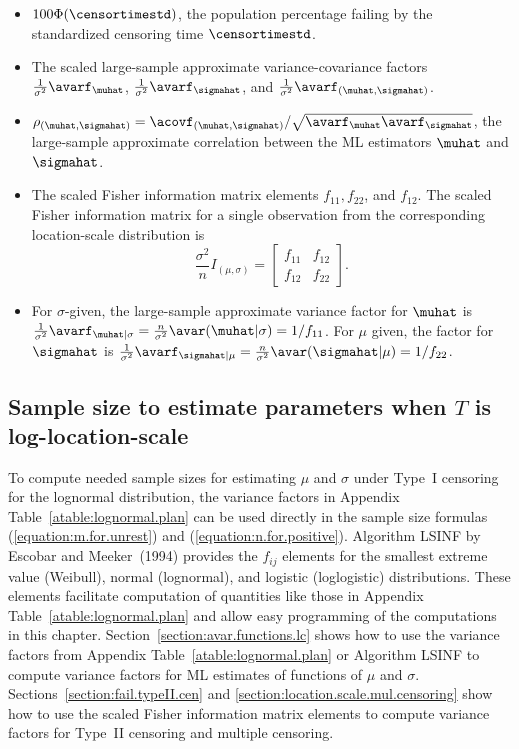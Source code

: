 \begin{itemize}
\item
$100\Phi(\censortimestd)$, the population percentage failing by
the standardized censoring time $\censortimestd$. 
\item
The scaled large-sample approximate variance-covariance factors
$\frac{1}{\sigma^2}\avarf_{\muhat}$,
$\frac{1}{\sigma^2}\avarf_{\sigmahat}$, and
$\frac{1}{\sigma^2}\avarf_{(\muhat,\sigmahat)}$.
\item 
$\rho_{( \muhat, \sigmahat) }=
\acovf_{(\muhat, \sigmahat)}/\sqrt{\avarf_{\muhat}\avarf_{\sigmahat}}$,
the large-sample approximate correlation between the ML estimators
$\muhat$ and $\sigmahat$.
\item
The scaled Fisher information matrix elements 
$f_{11}, f_{22}$, and $f_{12}$. The scaled Fisher information matrix for
a single observation from the corresponding location-scale distribution
is
\begin{displaymath}
\frac{\sigma^{2}}{n}I_{(\mu,\sigma)} = 
\left [
 \begin{array}{ll}
  f_{11} & f_{12} \\
  f_{12} & f_{22}
 \end{array}
\right ].
\end{displaymath}
\item
For $\sigma$-given, the large-sample approximate variance factor
for $\muhat$ is 
$\frac{1}{\sigma^2}\avarf_{\muhat|\sigma}=\frac{n}{\sigma^{2}}
\avar(\muhat|\sigma) = 1/f_{11} $. For $\mu$ given, the factor for $\sigmahat$ is 
$\frac{1}{\sigma^2}\avarf_{\sigmahat|\mu}=\frac{n}{\sigma^{2}}
\avar(\sigmahat|\mu) = 1/f_{22} $.
\end{itemize}

\subsection{Sample size to estimate 
parameters when $T$ is log-location-scale} To compute needed sample
sizes for estimating $\mu$ and $\sigma$ under Type~I censoring for
the lognormal distribution, the variance factors in Appendix
Table~\ref{atable:lognormal.plan} can be used directly in the sample
size formulas (\ref{equation:m.for.unrest}) and
(\ref{equation:n.for.positive}). Algorithm LSINF by Escobar and
Meeker~(1994) provides the $f_{ij}$ elements for the smallest
extreme value (Weibull), normal (lognormal), and logistic
(loglogistic) distributions.  These elements facilitate computation
of quantities like those in Appendix
Table~\ref{atable:lognormal.plan} and allow easy programming of the
computations in this chapter.
Section~\ref{section:avar.functions.lc} shows how to use the
variance factors from Appendix Table~\ref{atable:lognormal.plan} or
Algorithm LSINF to compute variance factors for ML estimates of
functions of $\mu$ and
$\sigma$. Sections~\ref{section:fail.typeII.cen} and
\ref{section:location.scale.mul.censoring} show how to use the
scaled Fisher information matrix elements to compute variance
factors for Type~II censoring and multiple censoring.  

